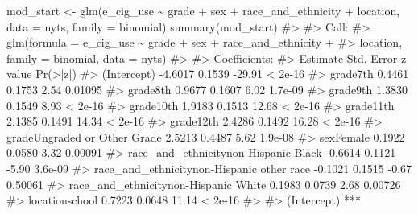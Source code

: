 \documentclass[
  letterpaper,
]{krantz}
\makeatletter
\newenvironment{Shaded}{\begin{snugshade}}{\end{snugshade}}
\newcommand{\AttributeTok}[1]{\textcolor[rgb]{0.40,0.45,0.13}{#1}}
\newcommand{\CommentTok}[1]{\textcolor[rgb]{0.37,0.37,0.37}{#1}}
\newcommand{\FunctionTok}[1]{\textcolor[rgb]{0.28,0.35,0.67}{#1}}
\newcommand{\NormalTok}[1]{\textcolor[rgb]{0.00,0.23,0.31}{#1}}
\newcommand{\OtherTok}[1]{\textcolor[rgb]{0.00,0.23,0.31}{#1}}
\newcommand{\SpecialCharTok}[1]{\textcolor[rgb]{0.37,0.37,0.37}{#1}}
\newenvironment{kframe}{%
\medskip{}
\setlength{\fboxsep}{.8em}
 \def\at@end@of@kframe{}%
 \ifinner\ifhmode%
  \def\at@end@of@kframe{\end{minipage}}%
  \begin{minipage}{\columnwidth}%
 \fi\fi%
 \def\FrameCommand##1{\hskip\@totalleftmargin \hskip-\fboxsep
 \colorbox{shadecolor}{##1}\hskip-\fboxsep
     \hskip-\linewidth \hskip-\@totalleftmargin \hskip\columnwidth}%
 \MakeFramed {\advance\hsize-\width
   \@totalleftmargin\z@ \linewidth\hsize
   \@setminipage}}%
 {\par\unskip\endMakeFramed%
 \at@end@of@kframe}
\renewenvironment{Shaded}{\begin{kframe}}{\end{kframe}}
\makeatother
\begin{document}
\begin{Shaded}
\begin{Highlighting}[]
\NormalTok{mod\_start }\OtherTok{\textless{}{-}} \FunctionTok{glm}\NormalTok{(e\_cig\_use }\SpecialCharTok{\textasciitilde{}}\NormalTok{ grade }\SpecialCharTok{+}\NormalTok{ sex }\SpecialCharTok{+}\NormalTok{ race\_and\_ethnicity }\SpecialCharTok{+}\NormalTok{ location,}
                 \AttributeTok{data =}\NormalTok{ nyts, }\AttributeTok{family =}\NormalTok{ binomial)}
\FunctionTok{summary}\NormalTok{(mod\_start)}
\CommentTok{\#\textgreater{} }
\CommentTok{\#\textgreater{} Call:}
\CommentTok{\#\textgreater{} glm(formula = e\_cig\_use \textasciitilde{} grade + sex + race\_and\_ethnicity + }
\CommentTok{\#\textgreater{}     location, family = binomial, data = nyts)}
\CommentTok{\#\textgreater{} }
\CommentTok{\#\textgreater{} Coefficients:}
\CommentTok{\#\textgreater{}                                           Estimate Std. Error z value Pr(\textgreater{}|z|)}
\CommentTok{\#\textgreater{} (Intercept)                                {-}4.6017     0.1539  {-}29.91  \textless{} 2e{-}16}
\CommentTok{\#\textgreater{} grade7th                                    0.4461     0.1753    2.54  0.01095}
\CommentTok{\#\textgreater{} grade8th                                    0.9677     0.1607    6.02  1.7e{-}09}
\CommentTok{\#\textgreater{} grade9th                                    1.3830     0.1549    8.93  \textless{} 2e{-}16}
\CommentTok{\#\textgreater{} grade10th                                   1.9183     0.1513   12.68  \textless{} 2e{-}16}
\CommentTok{\#\textgreater{} grade11th                                   2.1385     0.1491   14.34  \textless{} 2e{-}16}
\CommentTok{\#\textgreater{} grade12th                                   2.4286     0.1492   16.28  \textless{} 2e{-}16}
\CommentTok{\#\textgreater{} gradeUngraded or Other Grade                2.5213     0.4487    5.62  1.9e{-}08}
\CommentTok{\#\textgreater{} sexFemale                                   0.1922     0.0580    3.32  0.00091}
\CommentTok{\#\textgreater{} race\_and\_ethnicitynon{-}Hispanic Black       {-}0.6614     0.1121   {-}5.90  3.6e{-}09}
\CommentTok{\#\textgreater{} race\_and\_ethnicitynon{-}Hispanic other race  {-}0.1021     0.1515   {-}0.67  0.50061}
\CommentTok{\#\textgreater{} race\_and\_ethnicitynon{-}Hispanic White        0.1983     0.0739    2.68  0.00726}
\CommentTok{\#\textgreater{} locationschool                              0.7223     0.0648   11.14  \textless{} 2e{-}16}
\CommentTok{\#\textgreater{}                                              }
\CommentTok{\#\textgreater{} (Intercept)                               ***}

\end{Highlighting}
\end{Shaded}
\end{document}
